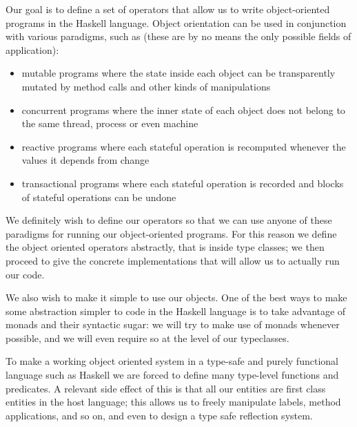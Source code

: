Our goal is to define a set of operators that allow us to write
object-oriented programs in the Haskell language. Object orientation
can be used in conjunction with various paradigms, such as (these are
by no means the only possible fields of application): 
\begin{itemize}
\item mutable programs where the state inside each object can be
  transparently mutated by method calls and other kinds of
  manipulations 
\item concurrent programs where the inner state of each object does
  not belong to the same thread, process or even machine 
\item reactive programs where each stateful operation is recomputed
  whenever the values it depends from change 
\item transactional programs where each stateful operation is recorded
  and blocks of stateful operations can be undone 
\end{itemize}

We definitely wish to define our operators so that we can use anyone
of these paradigms for running our object-oriented programs. For this 
reason we define the object oriented operators abstractly, that is
inside type classes; we then proceed to give the concrete
implementations  that will allow us to actually run our code.

We also wish to make it simple to use our objects. One of the best
ways to make some abstraction simpler to code in the Haskell language
is to take advantage of monads and their syntactic sugar: we will try
to make use of monads whenever possible, and we will even require so
at the level of our typeclasses.

To make a working object oriented system in a type-safe and purely
functional language such as Haskell we are forced to define many  
type-level functions and predicates. A relevant side effect of this is
that all our entities are first class entities in the host language; 
this allows us to freely manipulate labels, method applications, and
so on, and even to design a type safe reflection system. 
